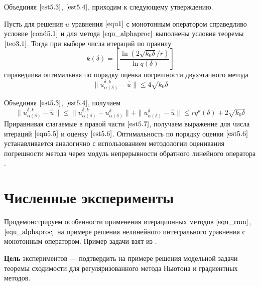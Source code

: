 Объединяя $\eqref{est5.3}$, $\eqref{est5.4}$, приходим к следующему утверждению.
\begin{theorem}\label{teo5.1}
	Пусть для решения $\hat{u}$ уравнения $\eqref{equ1}$ с монотонным оператором справедливо условие $\eqref{cond5.1}$ и для метода $\eqref{equ_alphaproc}$ выполнены условия теоремы $\ref{teo3.1}$. Тогда при выборе числа итераций по правилу
	\begin{equation}\label{equ5.5}
	k(\delta)=\left[\frac{\ln(2\sqrt{k_0\delta}/r)}{\ln q(\delta)}\right]
	\end{equation}
	справедлива оптимальная по порядку оценка погрешности двухэтапного метода
	\begin{equation}\label{est5.6}
	\|u_{\alpha(\delta)}^{\delta, k}-\hat{u}\|\le 4\sqrt{k_0 \delta}
	\end{equation}
\end{theorem}
\proof Объединяя $\eqref{est5.3}$, $\eqref{est5.4}$, получаем
\begin{equation}\label{est5.7}
\|u_{\alpha(\delta)}^{\delta, k}-\hat{u}\|\le\|u_{\alpha(\delta)}^{\delta, k}-u_{\alpha(\delta)}^{\delta}\|+\|u_{\alpha(\delta)}^{\delta}-\hat{u}\|\le rq^k(\delta)+ 2\sqrt{k_0\delta}
\end{equation}
Приравнивая слагаемые в правой части $\eqref{est5.7}$, получаем выражение для числа итераций $\eqref{equ5.5}$ и оценку $\eqref{est5.6}$. Оптимальность по порядку оценки $\eqref{est5.6}$ устанавливается аналогично \cite{Vasin2015} с использованием методологии оценивания погрешности метода через модуль непрерывности обратного линейного оператора \cite{Ivanov1974, IvaVasTan2002}.

\newpage
\section{Численные эксперименты}

Продемонстрируем особенности применения итерационных методов $\eqref{equ_rmn}$, $\eqref{equ_alphaproc}$ на примере решения нелинейного интегрального уравнения с монотонным оператором. Пример задачи взят из \cite{Tau2002}.

{\bfseries Цель} экспериментов --- подтвердить на примере решения модельной задачи теоремы сходимости для регуляризованного метода Ньютона и градиентных методов.

